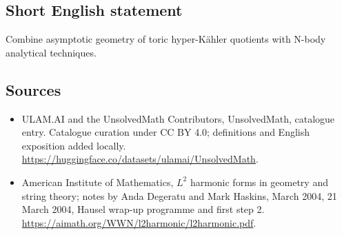 \documentclass[11pt]{article}
\begin{document}
\subsection{Short English statement}
Combine asymptotic geometry of toric hyper-Kähler quotients with N-body analytical techniques.
\subsection{Sources}
\begin{itemize}
\item[\hypertarget{source:statement:1}{S1}] ULAM.AI and the UnsolvedMath Contributors, UnsolvedMath, catalogue entry. Catalogue curation under CC BY 4.0; definitions and English exposition added locally.
\url{https://huggingface.co/datasets/ulamai/UnsolvedMath}.
\item[\hypertarget{source:statement:2}{S2}] American Institute of Mathematics, $L^2$ harmonic forms in geometry and string theory; notes by Anda Degeratu and Mark Haskins, March 2004, 21 March 2004, Hausel wrap-up programme and first step 2.
\url{https://aimath.org/WWN/l2harmonic/l2harmonic.pdf}.
\end{itemize}
\label{end:statement}
\end{document}
